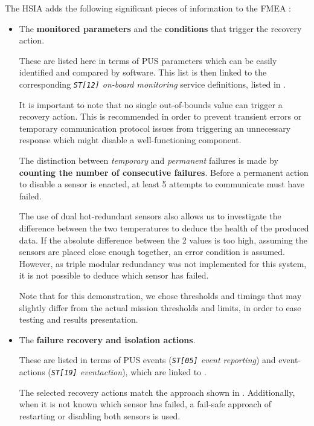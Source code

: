 \documentclass[a4paper,nobib]{tufte-book}
\begin{document}
The \ac{HSIA} adds the following significant pieces of information to the \ac{FMEA} \autocite{ECSS-Q-ST-30-02C}:
\begin{itemize}
	\item The \textbf{monitored parameters} and the \textbf{conditions} that trigger the recovery action.
	
	These are listed here in terms of \ac{PUS} parameters which can be easily identified and compared by software. This list is then linked to the corresponding \emph{\texttt{ST[12]} on-board monitoring} service definitions, listed in .
	
	It is important to note that no single out-of-bounds value can trigger a recovery action. This is recommended in order to prevent transient errors or temporary communication protocol issues from triggering an unnecessary response which might disable a well-functioning component.
	
	The distinction between \emph{temporary} and \emph{permanent} failures is made by \textbf{counting the number of consecutive failures}. Before a permanent action to disable a sensor is enacted, at least 5 attempts to communicate must have failed.
	
	The use of dual hot-redundant sensors also allows us to investigate the difference between the two temperatures to deduce the health of the produced data. If the absolute difference between the 2 values is too high, assuming the sensors are placed close enough together, an error condition is assumed. However, as triple modular redundancy was not implemented for this system, it is not possible to deduce which sensor has failed.
	
	Note that for this demonstration, we chose thresholds and timings that may slightly differ from the actual mission thresholds and limits, in order to ease testing and results presentation.
	
	\item The \textbf{failure recovery and isolation actions}.
	
	These are listed in terms of \ac{PUS} events (\emph{\texttt{ST[05]} event reporting}) and event-actions (\emph{\texttt{ST[19]} eventaction}), which are linked to .
	
	The selected recovery actions match the approach shown in . Additionally, when it is not known which sensor has failed, a fail-safe approach of restarting or disabling both sensors is used.
\end{itemize}
\end{document}
